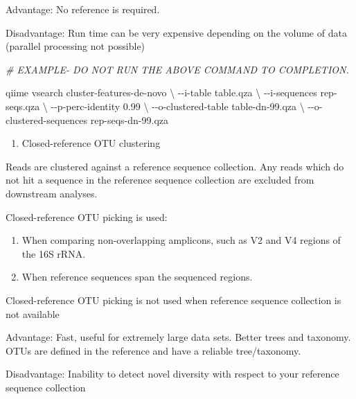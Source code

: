 \documentclass[
]{book}
\newenvironment{Shaded}{\begin{snugshade}}{\end{snugshade}}
\newcommand{\CommentTok}[1]{\textcolor[rgb]{0.56,0.35,0.01}{\textit{#1}}}
\newcommand{\DataTypeTok}[1]{\textcolor[rgb]{0.13,0.29,0.53}{#1}}
\newcommand{\ExtensionTok}[1]{#1}
\newcommand{\NormalTok}[1]{#1}
\providecommand{\tightlist}{%
  \setlength{\itemsep}{0pt}\setlength{\parskip}{0pt}}
\begin{document}
Advantage: No reference is required.

Disadvantage: Run time can be very expensive depending on the volume of data (parallel processing not possible)

\begin{Shaded}
\begin{Highlighting}[]
\CommentTok{\# EXAMPLE{-} DO NOT RUN THE ABOVE COMMAND TO COMPLETION.}

\ExtensionTok{qiime}\NormalTok{ vsearch cluster{-}features{-}de{-}novo }\DataTypeTok{\textbackslash{}}
\NormalTok{{-}{-}i{-}table table.qza }\DataTypeTok{\textbackslash{}}
\NormalTok{{-}{-}i{-}sequences rep{-}seqs.qza }\DataTypeTok{\textbackslash{}}
\NormalTok{{-}{-}p{-}perc{-}identity 0.99 }\DataTypeTok{\textbackslash{}}
\NormalTok{{-}{-}o{-}clustered{-}table table{-}dn{-}99.qza }\DataTypeTok{\textbackslash{}}
\NormalTok{{-}{-}o{-}clustered{-}sequences rep{-}seqs{-}dn{-}99.qza}
\end{Highlighting}
\end{Shaded}

\begin{enumerate}
\def\labelenumi{\Roman{enumi}.}
\setcounter{enumi}{1}
\tightlist
\item
  Closed-reference OTU clustering
\end{enumerate}

Reads are clustered against a reference sequence collection. Any reads which do not hit a sequence in the reference sequence collection are excluded from downstream analyses.

Closed-reference OTU picking is used:

\begin{enumerate}
\def\labelenumi{\arabic{enumi}.}
\item
  When comparing non-overlapping amplicons, such as V2 and V4 regions of the 16S rRNA.
\item
  When reference sequences span the sequenced regions.
\end{enumerate}

Closed-reference OTU picking is not used when reference sequence collection is not available

Advantage: Fast, useful for extremely large data sets. Better trees and taxonomy. OTUs are defined in the reference and have a reliable tree/taxonomy.

Disadvantage: Inability to detect novel diversity with respect to your reference sequence collection
\end{document}
